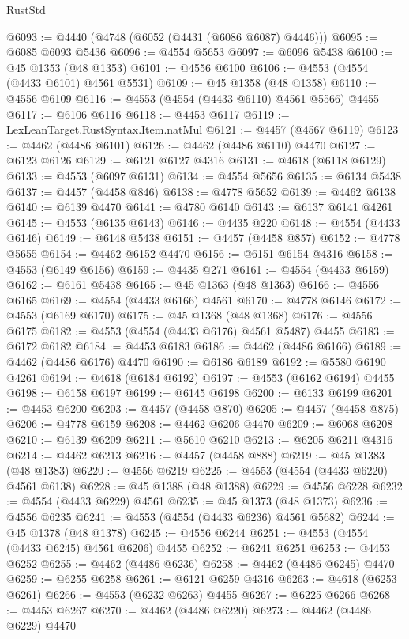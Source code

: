\begin{lexlean}{RustStd}
\begin{coremodule}
@6093 := @4440 (@4748 (@6052 (@4431 (@6086 @6087) @4446)))
@6095 := @6085 @6093 @5436
@6096 := @4554 @5653
@6097 := @6096 @5438
@6100 := @45 @1353 (@48 @1353)
@6101 := @4556 @6100
@6106 := @4553 (@4554 (@4433 @6101) @4561 @5531)
@6109 := @45 @1358 (@48 @1358)
@6110 := @4556 @6109
@6116 := @4553 (@4554 (@4433 @6110) @4561 @5566) @4455
@6117 := @6106 @6116
@6118 := @4453 @6117
@6119 := LexLeanTarget.RustSyntax.Item.natMul
@6121 := @4457 (@4567 @6119)
@6123 := @4462 (@4486 @6101)
@6126 := @4462 (@4486 @6110) @4470
@6127 := @6123 @6126
@6129 := @6121 @6127 @4316
@6131 := @4618 (@6118 @6129)
@6133 := @4553 (@6097 @6131)
@6134 := @4554 @5656
@6135 := @6134 @5438
@6137 := @4457 (@4458 @846)
@6138 := @4778 @5652
@6139 := @4462 @6138
@6140 := @6139 @4470
@6141 := @4780 @6140
@6143 := @6137 @6141 @4261
@6145 := @4553 (@6135 @6143)
@6146 := @4435 @220
@6148 := @4554 (@4433 @6146)
@6149 := @6148 @5438
@6151 := @4457 (@4458 @857)
@6152 := @4778 @5655
@6154 := @4462 @6152 @4470
@6156 := @6151 @6154 @4316
@6158 := @4553 (@6149 @6156)
@6159 := @4435 @271
@6161 := @4554 (@4433 @6159)
@6162 := @6161 @5438
@6165 := @45 @1363 (@48 @1363)
@6166 := @4556 @6165
@6169 := @4554 (@4433 @6166) @4561
@6170 := @4778 @6146
@6172 := @4553 (@6169 @6170)
@6175 := @45 @1368 (@48 @1368)
@6176 := @4556 @6175
@6182 := @4553 (@4554 (@4433 @6176) @4561 @5487) @4455
@6183 := @6172 @6182
@6184 := @4453 @6183
@6186 := @4462 (@4486 @6166)
@6189 := @4462 (@4486 @6176) @4470
@6190 := @6186 @6189
@6192 := @5580 @6190 @4261
@6194 := @4618 (@6184 @6192)
@6197 := @4553 (@6162 @6194) @4455
@6198 := @6158 @6197
@6199 := @6145 @6198
@6200 := @6133 @6199
@6201 := @4453 @6200
@6203 := @4457 (@4458 @870)
@6205 := @4457 (@4458 @875)
@6206 := @4778 @6159
@6208 := @4462 @6206 @4470
@6209 := @6068 @6208
@6210 := @6139 @6209
@6211 := @5610 @6210
@6213 := @6205 @6211 @4316
@6214 := @4462 @6213
@6216 := @4457 (@4458 @888)
@6219 := @45 @1383 (@48 @1383)
@6220 := @4556 @6219
@6225 := @4553 (@4554 (@4433 @6220) @4561 @6138)
@6228 := @45 @1388 (@48 @1388)
@6229 := @4556 @6228
@6232 := @4554 (@4433 @6229) @4561
@6235 := @45 @1373 (@48 @1373)
@6236 := @4556 @6235
@6241 := @4553 (@4554 (@4433 @6236) @4561 @5682)
@6244 := @45 @1378 (@48 @1378)
@6245 := @4556 @6244
@6251 := @4553 (@4554 (@4433 @6245) @4561 @6206) @4455
@6252 := @6241 @6251
@6253 := @4453 @6252
@6255 := @4462 (@4486 @6236)
@6258 := @4462 (@4486 @6245) @4470
@6259 := @6255 @6258
@6261 := @6121 @6259 @4316
@6263 := @4618 (@6253 @6261)
@6266 := @4553 (@6232 @6263) @4455
@6267 := @6225 @6266
@6268 := @4453 @6267
@6270 := @4462 (@4486 @6220)
@6273 := @4462 (@4486 @6229) @4470

\end{coremodule}
\end{lexlean}

